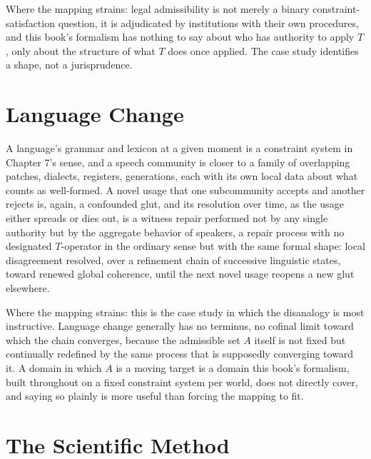 \documentclass[11pt]{book}
\begin{document}
Where the mapping strains: legal admissibility is not merely a binary constraint-satisfaction question, it is adjudicated by institutions with their own procedures, and this book's formalism has nothing to say about who has authority to apply $T$, only about the structure of what $T$ does once applied. The case study identifies a shape, not a jurisprudence.

\section*{Language Change}

A language's grammar and lexicon at a given moment is a constraint system in Chapter 7's sense, and a speech community is closer to a family of overlapping patches, dialects, registers, generations, each with its own local data about what counts as well-formed. A novel usage that one subcommunity accepts and another rejects is, again, a confounded glut, and its resolution over time, as the usage either spreads or dies out, is a witness repair performed not by any single authority but by the aggregate behavior of speakers, a repair process with no designated $T$-operator in the ordinary sense but with the same formal shape: local disagreement resolved, over a refinement chain of successive linguistic states, toward renewed global coherence, until the next novel usage reopens a new glut elsewhere.

Where the mapping strains: this is the case study in which the disanalogy is most instructive. Language change generally has no terminus, no cofinal limit toward which the chain converges, because the admissible set $A$ itself is not fixed but continually redefined by the same process that is supposedly converging toward it. A domain in which $A$ is a moving target is a domain this book's formalism, built throughout on a fixed constraint system per world, does not directly cover, and saying so plainly is more useful than forcing the mapping to fit.

\section*{The Scientific Method}
\end{document}
